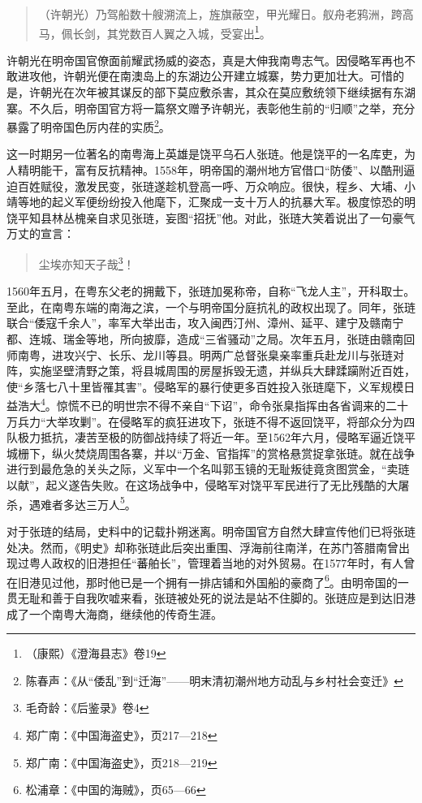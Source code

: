 \begin{quote}

（许朝光）乃驾船数十艘溯流上，旌旗蔽空，甲光耀日。舣舟老鸦洲，跨高马，佩长剑，其党数百人翼之入城，受宴出\footnote{（康熙）《澄海县志》卷19}。

\end{quote}

许朝光在明帝国官僚面前耀武扬威的姿态，真是大伸我南粤志气。因侵略军再也不敢进攻他，许朝光便在南澳岛上的东湖边公开建立城寨，势力更加壮大。可惜的是，许朝光在次年被其谋反的部下莫应敷杀害，其众在莫应敷统领下继续据有东湖寨。不久后，明帝国官方将一篇祭文赠予许朝光，表彰他生前的“归顺”之举，充分暴露了明帝国色厉内荏的实质\footnote{陈春声：《从“倭乱”到“迁海”——明末清初潮州地方动乱与乡村社会变迁》}。

这一时期另一位著名的南粤海上英雄是饶平乌石人张琏。他是饶平的一名库吏，为人精明能干，富有反抗精神。1558年，明帝国的潮州地方官借口“防倭”、以酷刑逼迫百姓赋役，激发民变，张琏遂趁机登高一呼、万众响应。很快，程乡、大埔、小靖等地的起义军便纷纷投入他麾下，汇聚成一支十万人的抗暴大军。极度惊恐的明饶平知县林丛槐亲自求见张琏，妄图“招抚”他。对此，张琏大笑着说出了一句豪气万丈的宣言：

\begin{quote}

尘埃亦知天子哉\footnote{毛奇龄：《后鉴录》卷4}！

\end{quote}

1560年五月，在粤东父老的拥戴下，张琏加冕称帝，自称“飞龙人主”，开科取士。至此，在南粤东端的南海之滨，一个与明帝国分庭抗礼的政权出现了。同年，张琏联合“倭寇千余人”，率军大举出击，攻入闽西汀州、漳州、延平、建宁及赣南宁都、连城、瑞金等地，所向披靡，造成“三省骚动”之局。次年五月，张琏由赣南回师南粤，进攻兴宁、长乐、龙川等县。明两广总督张臬亲率重兵赴龙川与张琏对阵，实施坚壁清野之策，将县城周围的房屋拆毁无遗，并纵兵大肆蹂躏附近百姓，使“乡落七八十里皆罹其害”。侵略军的暴行使更多百姓投入张琏麾下，义军规模日益浩大\footnote{郑广南：《中国海盗史》，页217—218}。惊慌不已的明世宗不得不亲自“下诏”，命令张臬指挥由各省调来的二十万兵力“大举攻剿”。在侵略军的疯狂进攻下，张琏不得不返回饶平，将部众分为四队极力抵抗，凄苦至极的防御战持续了将近一年。至1562年六月，侵略军逼近饶平城栅下，纵火焚烧周围各寨，并以“万金、官指挥”的赏格悬赏捉拿张琏。就在战争进行到最危急的关头之际，义军中一个名叫郭玉镜的无耻叛徒竟贪图赏金，“卖琏以献”，起义遂告失败。在这场战争中，侵略军对饶平军民进行了无比残酷的大屠杀，遇难者多达三万人\footnote{郑广南：《中国海盗史》，页218—219}。

对于张琏的结局，史料中的记载扑朔迷离。明帝国官方自然大肆宣传他们已将张琏处决。然而，《明史》却称张琏此后突出重围、浮海前往南洋，在苏门答腊南曾出现过粤人政权的旧港担任“蕃舶长”，管理着当地的对外贸易。在1577年时，有人曾在旧港见过他，那时他已是一个拥有一排店铺和外国船的豪商了\footnote{松浦章：《中国的海贼》，页65—66}。由明帝国的一贯无耻和善于自我吹嘘来看，张琏被处死的说法是站不住脚的。张琏应是到达旧港成了一个南粤大海商，继续他的传奇生涯。 


